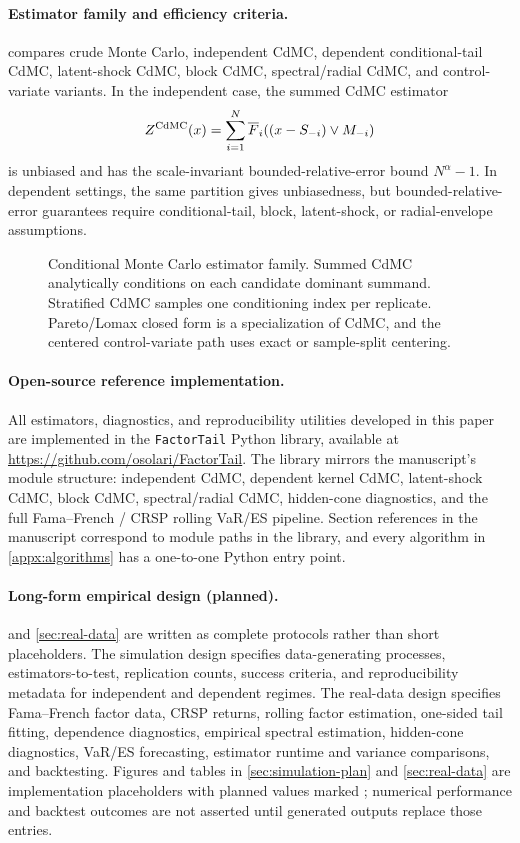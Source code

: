 \paragraph{Estimator family and efficiency criteria.}
 compares crude Monte Carlo, independent CdMC,
dependent conditional-tail CdMC, latent-shock CdMC, block CdMC, spectral/radial
CdMC, and control-variate variants. In the independent case, the summed CdMC
estimator
\[
  Z^{\mathrm{CdMC}}(x)=\sum_{i=1}^N \overline{F}_i((x-S_{-i})\vee M_{-i})
\]
is unbiased and has the scale-invariant bounded-relative-error bound
$N^\alpha-1$. In dependent settings, the same partition gives unbiasedness, but
bounded-relative-error guarantees require conditional-tail, block, latent-shock,
or radial-envelope assumptions.

\begin{figure}[t]
\centering

\caption[Estimator family]{
  Conditional Monte Carlo estimator family. Summed CdMC analytically conditions
  on each candidate dominant summand. Stratified CdMC samples one conditioning
  index per replicate. Pareto/Lomax closed form is a specialization of CdMC, and
  the centered control-variate path uses exact or sample-split centering.
}
\label{fig:estimators-flow}
\end{figure}

\paragraph{Open-source reference implementation.}
All estimators, diagnostics, and reproducibility utilities developed in this
paper are implemented in the \texttt{FactorTail} Python library, available at
\url{https://github.com/osolari/FactorTail}. The library mirrors the
manuscript's module structure: independent CdMC, dependent kernel CdMC,
latent-shock CdMC, block CdMC, spectral/radial CdMC, hidden-cone diagnostics,
and the full Fama--French / CRSP rolling VaR/ES pipeline. Section references
in the manuscript correspond to module paths in the library, and every
algorithm in \cref{appx:algorithms} has a one-to-one Python entry point.

\paragraph{Long-form empirical design (planned).}
 and \cref{sec:real-data} are written as complete
protocols rather than short placeholders. The simulation design specifies
data-generating processes, estimators-to-test, replication counts, success
criteria, and reproducibility metadata for independent and dependent regimes.
The real-data design specifies Fama--French factor data, CRSP returns, rolling
factor estimation, one-sided tail fitting, dependence diagnostics, empirical
spectral estimation, hidden-cone diagnostics, VaR/ES forecasting, estimator
runtime and variance comparisons, and backtesting. Figures and tables in
\cref{sec:simulation-plan} and \cref{sec:real-data} are implementation
placeholders with planned values marked \xx{}; numerical performance and
backtest outcomes are not asserted until generated outputs replace those
entries.

